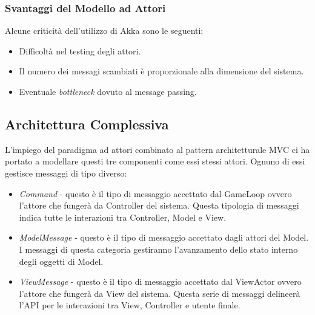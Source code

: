 \subsubsection{Svantaggi del Modello ad Attori}
Alcune criticità dell'utilizzo di Akka sono le seguenti:
\begin{itemize}
    \item Difficoltà nel testing degli attori.
    \item Il numero dei messagi scambiati è proporzionale alla dimensione del sistema.
    \item Eventuale \textit{bottleneck} dovuto al message passing.
\end{itemize}

\subsection{Architettura Complessiva}
L'impiego del paradigma ad attori combinato al pattern architetturale MVC ci ha portato a modellare questi tre componenti
come essi stessi attori. Ognuno di essi gestisce messaggi di tipo diverso:
\begin{itemize}
    \item \textit{Command} - questo è il tipo di messaggio accettato dal GameLoop ovvero l'attore che fungerà da
    Controller del sistema. Questa tipologia di messaggi indica tutte le interazioni tra Controller, Model e View.
    \item \textit{ModelMessage} - questo è il tipo di messaggio accettato dagli attori del Model. I messaggi di questa categoria
    gestiranno l'avanzamento dello stato interno degli oggetti di Model.
    \item \textit{ViewMessage} - questo è il tipo di messaggio accettato dal ViewActor ovvero l'attore che fungerà da View
    del sistema. Questa serie di messaggi delineerà l'API per le interazioni tra View, Controller e utente finale.
\end{itemize}

